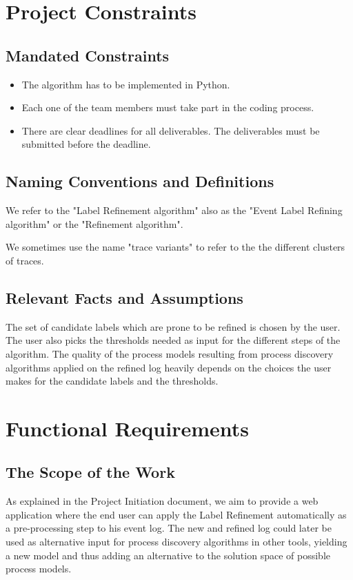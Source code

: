 \documentclass[notitlepage]{article}
\begin{document}
\begin{flushleft}
\section{Project Constraints}

\subsection{Mandated Constraints}
\begin{itemize}
\item The algorithm has to be implemented in Python.
\item Each one of the team members must take part in the coding process.
\item There are clear deadlines for all deliverables. The deliverables must be submitted before the deadline.
\end{itemize}



\subsection{Naming Conventions and Definitions}
We refer to the "Label Refinement algorithm" also as the "Event Label Refining algorithm" or the "Refinement algorithm".

We sometimes use the name "trace variants" to refer to the the different clusters of traces.




\subsection{Relevant Facts and Assumptions}
The set of candidate labels which are prone to be refined is chosen by the user. 
The user also picks the thresholds needed as input for the different steps of the algorithm.
The quality of the process models resulting from process discovery algorithms applied on the refined log heavily depends on the choices the user makes for the candidate labels and the thresholds.


\section{Functional Requirements}

\subsection{The Scope of the Work}
As explained in the Project Initiation document, we aim to provide a web application where the end user can apply the Label Refinement automatically as a pre-processing step to his event log.
The new and refined log could later be used as alternative input for process discovery algorithms in other tools, yielding a new model and thus adding an alternative to the solution space of possible process models.



\end{flushleft}
\end{document}
